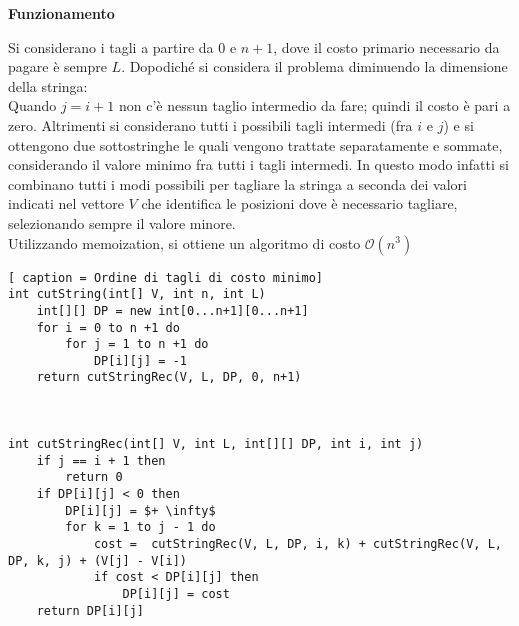 \documentclass[../cheatSheetAlgoritmi.tex]{subfiles}
\begin{document}
\begin{flushleft}
\textbf{Funzionamento}
\end{flushleft}
Si considerano i tagli a partire da $0$ e $n + 1$, dove il costo primario necessario da pagare è sempre $L$. Dopodiché si considera il problema diminuendo la dimensione della stringa: \\
Quando $j = i + 1$ non c'è nessun taglio intermedio da fare; quindi il costo è pari a zero. Altrimenti si considerano tutti i possibili tagli intermedi (fra $i$ e $j$) e si ottengono due sottostringhe le quali vengono trattate separatamente e sommate, considerando il valore minimo fra tutti i tagli intermedi. In questo modo infatti si combinano tutti i modi possibili per tagliare la stringa a seconda dei valori indicati nel vettore $V$ che identifica le posizioni dove è necessario tagliare, selezionando sempre il valore minore. \\
Utilizzando memoization, si ottiene un algoritmo di costo $\mathcal{O}(n^3)$
\newpage
\begin{lstlisting}[ caption = Ordine di tagli di costo minimo]
int cutString(int[] V, int n, int L)
	int[][] DP = new int[0...n+1][0...n+1]
	for i = 0 to n +1 do
		for j = 1 to n +1 do
			DP[i][j] = -1
	return cutStringRec(V, L, DP, 0, n+1)



int cutStringRec(int[] V, int L, int[][] DP, int i, int j)
	if j == i + 1 then
		return 0
	if DP[i][j] < 0 then
		DP[i][j] = $+ \infty$
		for k = 1 to j - 1 do
			cost =  cutStringRec(V, L, DP, i, k) + cutStringRec(V, L, DP, k, j) + (V[j] - V[i])
			if cost < DP[i][j] then
				DP[i][j] = cost
	return DP[i][j]
\end{lstlisting}
\newpage
\end{document}

